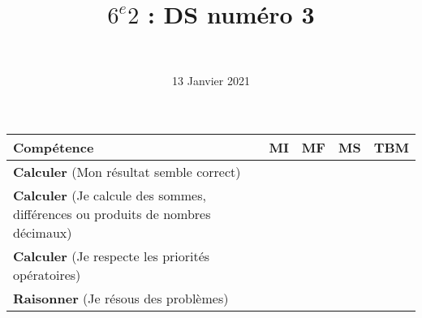 \documentclass[a4paper,11pt]{exam}
\author{\ }
\date{13 Janvier 2021}
\title{$6^e 2$ : DS num\'ero 3}
\begin{document}
%	

	\maketitle
	

\begin{small}
	\begin{center}
		\begin{tabular}{|@{\ }l@{\ }|@{\ }c@{\ }|@{\ }c@{\ }|@{\ }c@{\ }|@{\ }c@{\ }|}
			\hline
			\textbf{Compétence} & \textbf{MI} & \textbf{MF} & \textbf{MS} & \textbf{TBM} \\
			\hline
			\textbf{Calculer} (Mon résultat semble correct) &  \ \ & \ \ & \ \ & \ \  \\
			\hline
			\textbf{Calculer} (Je calcule des sommes, différences ou produits de nombres décimaux)&  \ \ & \ \ & \ \ & \ \  \\
			\hline
			\textbf{Calculer} (Je respecte les priorités opératoires)&  \ \ & \ \ & \ \ & \ \  \\
			\hline	
			\textbf{Raisonner} (Je résous des problèmes) & \ \ & \ \ &  \ \  & \ \ \\
			\hline
%			 
		\end{tabular}
	\end{center}
\end{small}	

	
	
%	






%

%



%








\label{LastPage}

%
\end{document}
